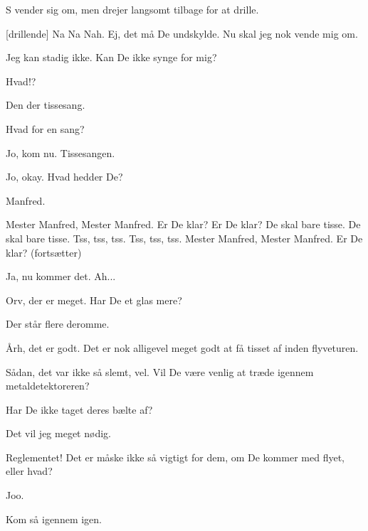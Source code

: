 \documentclass[a4paper,11pt]{article}
\begin{document}
\begin{sketch}
S vender sig om, men drejer langsomt tilbage for at drille.

[drillende] Na Na Nah. Ej, det må De undskylde. Nu skal jeg nok vende mig om.

 Jeg kan stadig ikke. Kan De ikke synge for mig?

 Hvad!?

 Den der tissesang.

 Hvad for en sang?

 Jo, kom nu. Tissesangen.


 Jo, okay. Hvad hedder De?

 Manfred.


  Mester Manfred, Mester Manfred. Er De klar? Er De klar? De skal bare tisse. De skal bare tisse. Tss, tss, tss. Tss, tss, tss. Mester Manfred, Mester Manfred. Er De klar? (fortsætter)

 Ja, nu kommer det. Ah...

 Orv, der er meget. Har De et glas mere?

 Der står flere deromme.

 Årh, det er godt. Det er nok alligevel meget godt at få tisset af inden flyveturen.


 Sådan, det var ikke så slemt, vel. Vil De være venlig at træde igennem metaldetektoreren?


 Har De ikke taget deres bælte af?

 Det vil jeg meget nødig.

 Reglementet! Det er måske ikke så vigtigt for dem, om De kommer med flyet, eller hvad?

 Joo.


 Kom så igennem igen.


\end{sketch}
\end{document}

